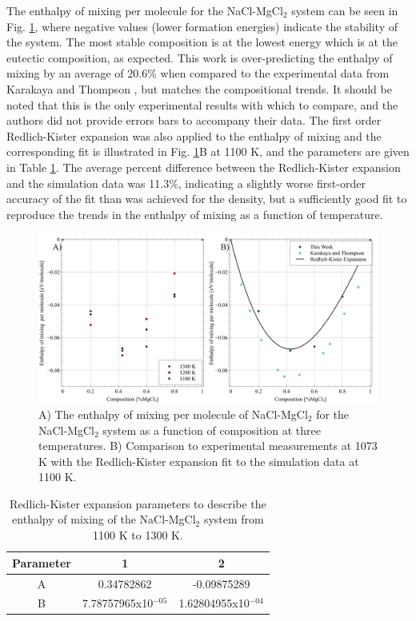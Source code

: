 \documentclass[review]{elsarticle}
\begin{document}
The enthalpy of mixing per molecule for the NaCl-MgCl$_2$ system can be seen in Fig. \ref{fig:enthalpy}, where negative values (lower formation energies) indicate the stability of the system. The most stable composition is at the lowest energy which is at the eutectic composition, as expected. This work is over-predicting the enthalpy of mixing by an average of 20.6\% when compared to the experimental data from Karakaya and Thompson \cite{karakaya1986thermodynamic}, but matches the compositional trends. It should be noted that this is the only experimental results with which to compare, and the authors did not provide errors bars to accompany their data. The first order Redlich-Kister expansion was also applied to the enthalpy of mixing and the corresponding fit is illustrated in Fig. \ref{fig:enthalpy}B at 1100 K, and the parameters are given in Table \ref{table:RK_en}. The average percent difference between the Redlich-Kister expansion and the simulation data was 11.3\%, indicating a slightly worse first-order accuracy of the fit than was achieved for the density, but a sufficiently good fit to reproduce the trends in the enthalpy of mixing as a function of temperature.

\begin{figure}[h]
 \centering
 \includegraphics[width=1.0\textwidth]{images/enthalpy.jpg} 
 \caption{A) The enthalpy of mixing per molecule of NaCl-MgCl$_{2}$ for the NaCl-MgCl$_{2}$ system as a function of composition at three temperatures. B) Comparison to experimental measurements at 1073 K \cite{karakaya1986thermodynamic} with the Redlich-Kister expansion fit to the simulation data at 1100 K.}
 \label{fig:enthalpy}
\end{figure} 

\begin{table}[]
\centering
\caption{Redlich-Kister expansion parameters to describe the enthalpy of mixing of the NaCl-MgCl$_2$ system from 1100 K to 1300 K.}
\begin{tabular}{|c|c|c|}
\hline
Parameter &1 & 2 \\
\hline

A	& 0.34782862    & -0.09875289\\
B	  & 7.78757965x10$^{-05}$   & 1.62804955x10$^{-04}$\\
\hline
\end{tabular}
\label{table:RK_en}
\end{table}
\end{document}
